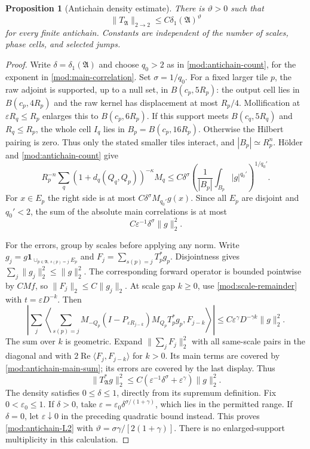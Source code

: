 \documentclass[11pt]{article}
\numberwithin{equation}{section}
\newtheorem{proposition}[theorem]{Proposition}
\theoremstyle{remark}
\theoremstyle{definition}
\begin{document}
\begin{proposition}[Antichain density estimate]\label{mod:antichain}
There is $\vartheta>0$ such that
\begin{equation}\label{mod:antichain-L2}
 \|T_{\mathfrak A}\|_{2\to2}
 \le C\delta_1(\mathfrak A)^\vartheta
\end{equation}
for every finite antichain. Constants are independent of the number of
scales, phase cells, and selected jumps.
\end{proposition}
\begin{proof}
Write $\delta=\delta_1(\mathfrak A)$ and choose $q_0>2$ as in
\eqref{mod:antichain-count}, for the exponent in
\eqref{mod:main-correlation}. Set $\sigma=1/q_0$.
For a fixed larger tile $p$, the raw adjoint is supported, up to a null
set, in $B(c_p,5R_p)$: the output cell lies in $B(c_p,4R_p)$ and
the raw kernel has displacement at most $R_p/4$. Mollification at
$\varepsilon R_q\le R_p$ enlarges this to $B(c_p,6R_p)$.
If this support meets $B(c_q,5R_q)$ and $R_q\le R_p$, the whole cell
$I_q$ lies in $B_p=B(c_p,16R_p)$. Otherwise the Hilbert pairing is zero.
Thus only the stated smaller tiles interact, and $|B_p|\simeq R_p^n$.
H\"older and \eqref{mod:antichain-count} give
\[
 R_p^{-n}\sum_q(1+d_q(Q_q,Q_p))^{-\kappa}M_q
 \le C\delta^\sigma
 \left(\frac1{|B_p|}\int_{B_p}|g|^{q_0'}\right)^{1/q_0'}.
\]
For $x\in E_p$ the right side is at most $C\delta^\sigma M_{q_0'}g(x)$.
Since all $E_p$ are disjoint and $q_0'<2$, the sum of the absolute main
correlations is at most
\begin{equation}\label{mod:antichain-main-sum}
 C\varepsilon^{-1}\delta^\sigma\|g\|_2^2.
\end{equation}

For the errors, group by scales before applying any norm. Write
$g_j=g\mathbf1_{\cup_{p\in\mathfrak A,\,s(p)=j}E_p}$ and
$F_j=\sum_{s(p)=j}T_p^*g_p$. Disjointness gives
$\sum_j\|g_j\|_2^2\le\|g\|_2^2$.
The corresponding forward operator is bounded pointwise by $CMf$, so
$\|F_j\|_2\le C\|g_j\|_2$.
At scale gap $k\ge0$, use \eqref{mod:scale-remainder} with
$t=\varepsilon D^{-k}$. Then
\[
 \left|\sum_j\left\langle
 \sum_{s(p)=j}M_{-Q_p}(I-P_{\varepsilon R_{j-k}})M_{Q_p}T_p^*g_p,
 F_{j-k}\right\rangle\right|
 \le C\varepsilon^\gamma D^{-\gamma k}\|g\|_2^2.
\]
The sum over $k$ is geometric. Expand
$\|\sum_jF_j\|_2^2$ with all same-scale pairs in the diagonal and with
$2\operatorname{Re}\langle F_j,F_{j-k}\rangle$ for $k>0$.
Its main terms are covered by \eqref{mod:antichain-main-sum}; its errors
are covered by the last display. Thus
\[
 \|T_{\mathfrak A}^*g\|_2^2
 \le C(\varepsilon^{-1}\delta^\sigma+\varepsilon^\gamma)\|g\|_2^2.
\]
The density satisfies $0\le\delta\le1$, directly from its supremum
definition. Fix $0<\varepsilon_0\le1$. If $\delta>0$, take
$\varepsilon=\varepsilon_0\delta^{\sigma/(1+\gamma)}$, which lies
in the permitted range. If $\delta=0$, let $\varepsilon\downarrow0$
in the preceding quadratic bound instead. This proves
\eqref{mod:antichain-L2} with
$\vartheta=\sigma\gamma/[2(1+\gamma)]$.
There is no enlarged-support multiplicity in this calculation.
\end{proof}
\end{document}
